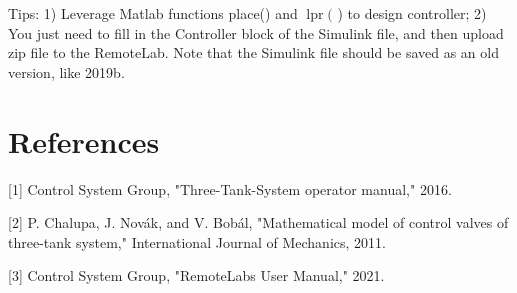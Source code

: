 \documentclass[10pt]{article}
\begin{document}
Tips: 1) Leverage Matlab functions place() and $\operatorname{lpr}($ ) to design controller; 2) You just need to fill in the Controller block of the Simulink file, and then upload zip file to the RemoteLab. Note that the Simulink file should be saved as an old version, like 2019b.

\section*{References}
[1] Control System Group, "Three-Tank-System operator manual," 2016.

[2] P. Chalupa, J. Novák, and V. Bobál, "Mathematical model of control valves of three-tank system," International Journal of Mechanics, 2011.

[3] Control System Group, "RemoteLabs User Manual," 2021.
\end{document}

